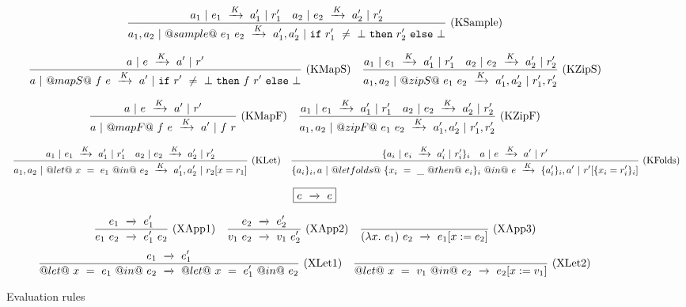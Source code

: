 \begin{figure*}
$$
\ruleIN
{
    \SourceStepK{a_1}{e_1}{a_1'}{r_1'}
    \quad
    \SourceStepK{a_2}{e_2}{a_2'}{r_2'}
}
{
    \SourceStepK{a_1,a_2}{@sample@~e_1~e_2}{a_1',a_2'}{\Ifnbot{r_1'}{r_2'}{\bot}}
}{KSample}
$$

$$
\ruleIN
{
    \SourceStepK{a}{e}{a'}{r'}
}
{
    \SourceStepK{a}{@mapS@~f~e}{a'}{\Ifnbot{r'}{f~r'}{\bot}}
}{KMapS}
\ruleIN
{
    \SourceStepK{a_1}{e_1}{a_1'}{r_1'}
    \quad
    \SourceStepK{a_2}{e_2}{a_2'}{r_2'}
}
{
    \SourceStepK{a_1,a_2}{@zipS@~e_1~e_2}{a_1',a_2'}{r_1',r_2'}
}{KZipS}
$$

$$
\ruleIN
{
    \SourceStepK{a}{e}{a'}{r'}
}
{
    \SourceStepK{a}{@mapF@~f~e}{a'}{f~r}
}{KMapF}
\ruleIN
{
    \SourceStepK{a_1}{e_1}{a_1'}{r_1'}
    \quad
    \SourceStepK{a_2}{e_2}{a_2'}{r_2'}
}
{
    \SourceStepK{a_1,a_2}{@zipF@~e_1~e_2}{a_1',a_2'}{r_1',r_2'}
}{KZipF}
$$

$$
\ruleIN
{
    \SourceStepK{a_1}{e_1}{a_1'}{r_1'}
    \quad
    \SourceStepK{a_2}{e_2}{a_2'}{r_2'}
}
{
    \SourceStepK{a_1,a_2}{@let@~x~=~e_1~@in@~e_2}{a_1',a_2'}{r_2[x=r_1]}
}{KLet}
\ruleIN
{
    \{ \SourceStepK{a_i}{e_i}{a_i'}{r_i'} \}_i
    \quad
    \SourceStepK{a}{e}{a'}{r'}
}
{
    \SourceStepK{\{a_i\}_i,a}{@let folds@~\{x_i~=~\_~@then@~e_i\}_i~@in@~e}{\{a_i'\}_i,a'}{r'[\{x_i=r_i'\}_i]}
}{KFolds}
$$



$$
\boxed{\SourceStepX{e}{e}}
$$

$$
\ruleIN
{
    \SourceStepX{e_1}{e_1'}
}
{
    \SourceStepX{e_1~e_2}{e_1'~e_2}
}{XApp1}
\ruleIN
{
    \SourceStepX{e_2}{e_2'}
}
{
    \SourceStepX{v_1~e_2}{v_1~e_2'}
}{XApp2}
\ruleAx
{
    \SourceStepX{(\lambda{}x.~e_1)~e_2}{e_1[x:=e_2]}
}{XApp3}
$$
$$
\ruleIN
{
    \SourceStepX{e_1}{e_1'}
}
{
    \SourceStepX{@let@~x~=~e_1~@in@~e_2}{@let@~x~=~e_1'~@in@~e_2}
}{XLet1}
\ruleAx
{
    \SourceStepX{@let@~x~=~v_1~@in@~e_2}{e_2[x:=v_1]}
}{XLet2}
$$

\caption{Evaluation rules}
\label{fig:source:eval}
\end{figure*}


